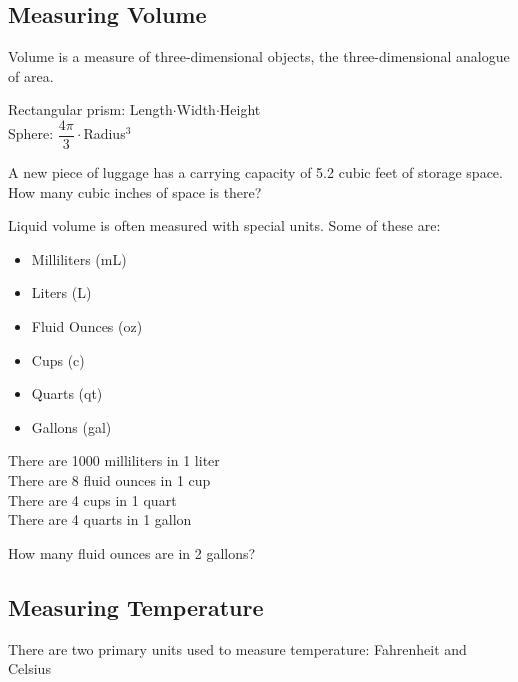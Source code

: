 \documentclass[notes]{subfiles}
\begin{document}
	\subsection*{Measuring Volume}
		Volume is a measure of three-dimensional objects, the three-dimensional analogue of area.%
		
		\begin{rmk}
			\tabitem Rectangular prism: Length\(\cdot\)Width\(\cdot\)Height\\[15pt]
			\tabitem Sphere: \(\dfrac{4\pi}{3}\cdot\)Radius\(^3\)
		\end{rmk}
		
		\begin{ex}
			A new piece of luggage has a carrying capacity of 5.2 cubic feet of storage space.  How many cubic inches of space is there?%
		\end{ex}
			\newpage
			
		Liquid volume is often measured with special units.  Some of these are:%
		
		\begin{itemize}
			\item Milliliters (mL)%
			\item Liters (L)%
			\item Fluid Ounces (oz)%
			\item Cups (c)%
			\item Quarts (qt)%
			\item Gallons (gal)%
		\end{itemize}
		
		\begin{rmk}
			\tabitem There are 1000 milliliters in 1 liter\\[15pt]
			\tabitem There are 8 fluid ounces in 1 cup\\[15pt]
			\tabitem There are 4 cups in 1 quart\\[15pt]
			\tabitem There are 4 quarts in 1 gallon
		\end{rmk}
		
		\begin{ex}
			How many fluid ounces are in 2 gallons?%
		\end{ex}
			\newpage
			
	\subsection*{Measuring Temperature}
		There are two primary units used to measure temperature: Fahrenheit and Celsius%
		
\end{document}
